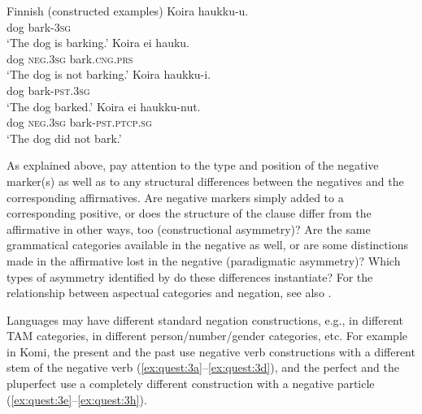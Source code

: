 \documentclass[output=paper,colorlinks,citecolor=brown]{langscibook}
\begin{document}
\ea\label{ex:quest:2}Finnish (constructed examples)
    \ea\label{ex:quest:2a}
        \gll Koira haukku-u. \\ 
             dog bark-3\textsc{sg} \\
        \glt ‘The dog is barking.’
    \ex\label{ex:quest:2b}
        \gll Koira ei hauku. \\
             dog \textsc{neg.3sg} bark.\textsc{cng.prs} \\
        \glt ‘The dog is not barking.’
    \ex\label{ex:quest:2c}
        \gll Koira haukku-i. \\ 
             dog bark-\textsc{pst.}3\textsc{sg} \\
        \glt ‘The dog barked.’
    \ex\label{ex:quest:2d}
        \gll Koira ei haukku-nut. \\
             dog \textsc{neg.3sg} bark-\textsc{pst.ptcp.sg} \\
        \glt ‘The dog did not bark.’
    \z
\z 

As explained above, pay attention to the type and position of the negative marker(s) as well as to any structural differences between the negatives and the corresponding affirmatives. Are negative markers simply added to a corresponding positive, or does the structure of the clause differ from the affirmative in other ways, too (constructional asymmetry)? Are the same grammatical categories available in the negative as well, or are some distinctions made in the affirmative lost in the negative (paradigmatic asymmetry)? Which types of asymmetry identified by \citet{Miestamo2005} do these differences instantiate? For the relationship between aspectual categories and negation, see also \citet{MiestamoAuwera2011}.

Languages may have different standard negation constructions, e.g., in different TAM categories, in different person/number/gender categories, etc. For example in Komi, the present and the past use negative verb constructions with a different stem of the negative verb (\ref{ex:quest:3a}--\ref{ex:quest:3d}), and the perfect and the pluperfect use a completely different construction with a negative particle  (\ref{ex:quest:3e}--\ref{ex:quest:3h}). 
\end{document}
